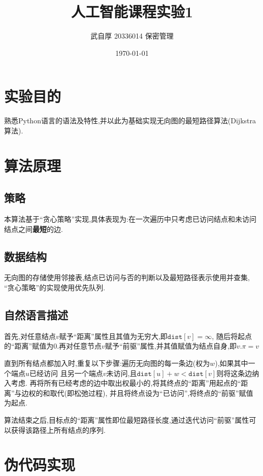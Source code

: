 \documentclass[UTF8]{ctexart}
\title{\textbf{人工智能课程实验1}}
\author{武自厚 20336014 保密管理}
\date{\today}
\newcommand{\var}[1]{\mathtt{#1}}
\begin{document}
    \maketitle

    \section{实验目的}

    熟悉Python语言的语法及特性,并以此为基础实现无向图的最短路径算法(Dijkstra算法).

    \section{算法原理}

    \subsection{策略}
    本算法基于“贪心策略”实现,具体表现为:在一次遍历中只考虑已访问结点和未访问
    结点之间\textbf{最短}的边.
    \subsection{数据结构}
    无向图的存储使用邻接表,结点已访问与否的判断以及最短路径表示使用并查集,
    “贪心策略”的实现使用优先队列.
    \subsection{自然语言描述}
    首先,对任意结点$v$赋予“距离”属性且其值为无穷大,即$\var{dist}[v] = \infty$,
    随后将起点的“距离”赋值为0.再对任意节点$v$赋予“前驱”属性,并其值赋值为结点自身,即$v.\pi = v$

    直到所有结点都加入时,重复以下步骤:遍历无向图的每一条边(权为$w$),如果其中一个端点$u$已经访问
    且另一个端点$v$未访问,且$\var{dist}[u] + w < \var{dist}[v]$则将这条边纳入考虑.
    再将所有已经考虑的边中取出权最小的,将其终点的“距离”用起点的“距离”与边权的和取代(即松弛过程),
    并且将终点设为“已访问”,将终点的“前驱”赋值为起点.

    算法结束之后,目标点的“距离”属性即位最短路径长度,通过迭代访问“前驱”属性可以获得该路径上所有结点的序列.

    \section{伪代码实现}
\end{document}
